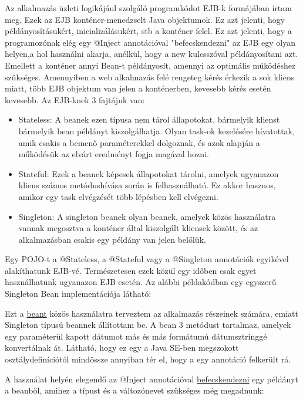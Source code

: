 \documentclass[centeredchapter]{thesis-ekf}
\theoremstyle{definition}
\theoremstyle{remark}
\begin{document}
Az alkalmazás üzleti logikájául szolgáló programkódot EJB-k formájában írtam meg.
Ezek az EJB konténer-menedzselt Java objektumok. Ez azt jelenti, hogy példányosításukért, inicializálásukért, stb a konténer felel. Ez azt jelenti, hogy a programozónak elég egy @Inject annotációval "befecskendezni" az EJB egy olyan helyen,a hol használni akarja, anélkül, hogy a new kulcsszóval példányosítani azt. Emellett a konténer annyi Bean-t példányosít, amennyi az optimális működéshez szükséges. Amennyiben a web alkalmazás felé rengeteg kérés érkezik a sok kliens miatt, több EJB objektum van jelen a konténerben, kevesebb kérés esetén kevesebb.
Az EJB-knek 3 fajtájuk van:
\begin{itemize}
	\item Stateless: A beanek ezen típusa nem tárol állapotokat, bármelyik klienst bármelyik bean példányt kiszolgálhatja. Olyan task-ok kezelésére hívatottak, amik csakis a bemenő paraméterekkel dolgoznak, és azok alapján a működésük az elvárt eredményt fogja magával hozni.
	\item Stateful: Ezek a beanek képesek állapotokat tárolni, amelyek ugyanazon kliens számos metódushívása során is felhasználható. Ez akkor hasznos, amikor egy task elvégzését több lépésben kell elvégezni.
	\item Singleton: A singleton beanek olyan beanek, amelyek közös használatra vannak megosztva a konténer által kiszolgált kliensek között, és az alkalmazásban csakis egy példány van jelen belőlük.
\end{itemize}

Egy POJO-t a @Stateless, a @Stateful vagy a @Singleton annotációk egyikével alakíthatunk EJB-vé. Természetesen ezek közül egy időben csak egyet használhatunk ugyanazon EJB esetén. Az alábbi példakódban egy egyszerű Singleton Bean implementációja látható:

\hypertarget{figure-dateformatconverter}{}


Ezt a \hyperlink{figure-dateformetconverter}{beant} közös használatra terveztem az alkalmazás részeinek számára, emiatt Singleton típusú beannek állítottam be. A bean 3 metódust tartalmaz, amelyek egy paraméterül kapott dátumot más és más formátumú dátumsztringgé konvertálnak át. Látható, hogy ez egy a Java SE-ben megszokott osztálydefiníciótól mindössze annyiban tér el, hogy a egy annotáció felkerült rá. 

A használat helyén elegendő az @Inject annotációval \hyperlink{figure-inject}{befecskendezni} egy példányt a beanből, amihez a típust és a változónevet szükséges még megadnunk:
\end{document}
